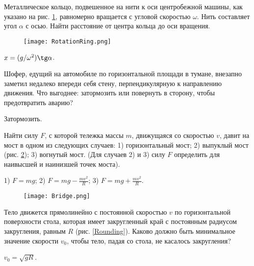 \begin{ex} %
Металлическое кольцо, подвешенное на нити к оси центробежной машины, как указано на рис. \ref{RotationRing}, равномерно вращается с угловой скоростью $\omega$. Нить составляет угол $\alpha$ с осью. Найти расстояние от центра кольца до оси вращения.

\begin{figure}
\centering
\texttt{[image: RotationRing.png]}
\caption{}
\label{RotationRing}
\end{figure}

\begin{ans}
$x = (g/\omega^2) \tg \alpha$.
\end{ans}
\end{ex}	

\qualProblems

\begin{ex} %
Шофер, едущий на автомобиле по горизонтальной площади в тумане, внезапно заметил недалеко впереди себя стену, перпендикулярную к направлению движения. Что выгоднее: затормозить или повернуть в сторону, чтобы предотвратить аварию?
\begin{ans}
Затормозить.
\end{ans}
\end{ex}	

\simpleProblems

\begin{ex} %
Найти силу $F$, с которой тележка массы $m$, движущаяся со скоростью $v$, давит на мост в одном из следующих случаев: 1) горизонтальный мост; 2) выпуклый мост (рис. \ref{Bridge}); 3) вогнутый мост. (Для случаев 2) и 3) силу $F$ определить для наивысшей и наинизшей точек моста).
\begin{ans}
1) $F=mg$; 2) $F=mg-\frac{mv^2}{R}$; 3) $F=mg+\frac{mv^2}{R}$.
\end{ans}
\end{ex}	

\begin{figure}[h]
\centering
\texttt{[image: Bridge.png]}
\caption{}
\label{Bridge}
\end{figure}

\begin{ex} %
Тело движется прямолинейно с постоянной скоростью $v$ по горизонтальной поверхности стола, которая имеет закругленный край с постоянным радиусом закругления, равным $R$ (рис. \ref{Rounding}). Каково должно быть минимальное значение скорости $v_0$, чтобы тело, падая со стола, не касалось закругления?
\begin{ans}
$v_0 = \sqrt{gR}$.
\end{ans}
\end{ex}	

